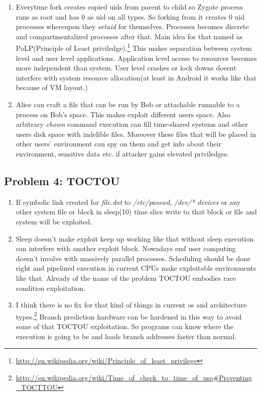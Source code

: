 \documentclass[11pt]{article}
\begin{document}
\begin{enumerate}[\indent a)]
\item Everytime fork creates copied uids from parent to child so Zygote process runs as root and has 0 as uid on all types. So forking from it creates 0 uid processes whereupon they \textit{setuid} for themselves. Processes becomes discrete and compartmentalized processes after that. Main idea for that named as PoLP(Principle of Least priviledge).\footnote{\url{http://en.wikipedia.org/wiki/Principle_of_least_privilege}} This makes separation between system level and user level applications. Application level access to resources becomes more independent than system. User level crashes or lock downs doesnt interfere with system resource allocation(at least in Android it works like that because of VM layout.)

\item Alice can craft a file that can be run by Bob or attachable runnable to a process on Bob's space. This makes exploit different users space. Also arbitrary \textit{chown} command execution can fill time-shared systems and other users disk space with indelible files. Moreover these files that will be placed in other users' environment can spy on them and get info about their environment, sensitive data etc. if attacker gains elevated priviledges.
\end{enumerate}

\subsection*{Problem 4: TOCTOU}
\begin{enumerate}[\indent a)]
\item If symbolic link created for \textit{file.dat} to \textit{/etc/passwd}, \textit{/dev/* devices} or any other system file or block in sleep(10) time slice write to that block or file and system will be exploited.

\item Sleep doesn't make exploit keep up working like that without sleep execution can interfere with another exploit block. Nowadays end user computing doesn't involve with massively parallel processes. Scheduling should be done right and pipelined execution in current CPUs make exploitable environments like that. Already of the name of the problem TOCTOU embodies race condition exploitation.

\item I think there is no fix for that kind of things in current os and architecture types.\footnote{\url{http://en.wikipedia.org/wiki/Time_of_check_to_time_of_use\#Preventing_TOCTTOU}} Branch prediction hardware can be hardened in this way to avoid some of that TOCTOU exploitation. So programs can know where the execution is going to be and loads branch addresses faster than normal.

\end{enumerate}

{}

\end{document}
